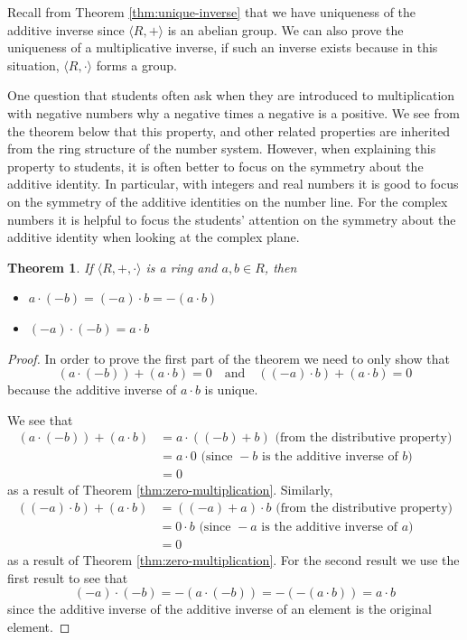 \documentclass[
]{book}
\newtheorem{theorem}{Theorem}[chapter]
\theoremstyle{definition}
\theoremstyle{definition}
\theoremstyle{definition}
\theoremstyle{remark}
\begin{document}
Recall from Theorem \ref{thm:unique-inverse} that we have uniqueness of the additive inverse since \(\langle R,+\rangle\) is an abelian group. We can also prove the uniqueness of a multiplicative inverse, if such an inverse exists because in this situation, \(\langle R,\cdot \rangle\) forms a group.

One question that students often ask when they are introduced to multiplication with negative numbers why a negative times a negative is a positive. We see from the theorem below that this property, and other related properties are inherited from the ring structure of the number system. However, when explaining this property to students, it is often better to focus on the symmetry about the additive identity. In particular, with integers and real numbers it is good to focus on the symmetry of the additive identities on the number line. For the complex numbers it is helpful to focus the students' attention on the symmetry about the additive identity when looking at the complex plane.

\begin{theorem}
\protect\hypertarget{thm:unnamed-chunk-171}{}{\label{thm:unnamed-chunk-171} }If \(\langle R,+,\cdot\rangle\) is a ring and \(a,b \in R\), then

\begin{itemize}
\item
  \(a\cdot (-b)=(-a)\cdot b=-(a\cdot b)\)
\item
  \((-a)\cdot (-b)=a\cdot b\)
\end{itemize}
\end{theorem}

\begin{proof}
{}In order to prove the first part of the theorem we need to only show that
\[\left( a \cdot (-b) \right) + \left(a \cdot b\right) =0 \quad \mbox{and} \quad \left((-a)\cdot b\right)+\left(a \cdot b\right) =0\] because the additive inverse of \(a\cdot b\) is unique.

We see that
\begin{align*}
(a \cdot (-b)) + (a \cdot b ) &= a \cdot ((-b)+b) \mbox{ (from the distributive property)} \\
&= a \cdot 0 \mbox{ (since } -b \mbox{ is the additive inverse of }b)\\
&= 0
\end{align*}
as a result of Theorem \ref{thm:zero-multiplication}.
Similarly,
\begin{align*}
( (-a) \cdot b) + (a \cdot b) &= ((-a)+a)\cdot b \mbox{ (from the distributive property)} \\
&= 0 \cdot b \mbox{ (since } -a \mbox{ is the additive inverse of } a)\\
&= 0
\end{align*}
as a result of Theorem \ref{thm:zero-multiplication}.
For the second result we use the first result to see that
\[(-a)\cdot (-b) = -\left(a \cdot (-b)\right) = - \left( - \left(a\cdot b\right) \right) = a \cdot b\] since the additive inverse of the additive inverse of an element is the original element.
\end{proof}
\end{document}
